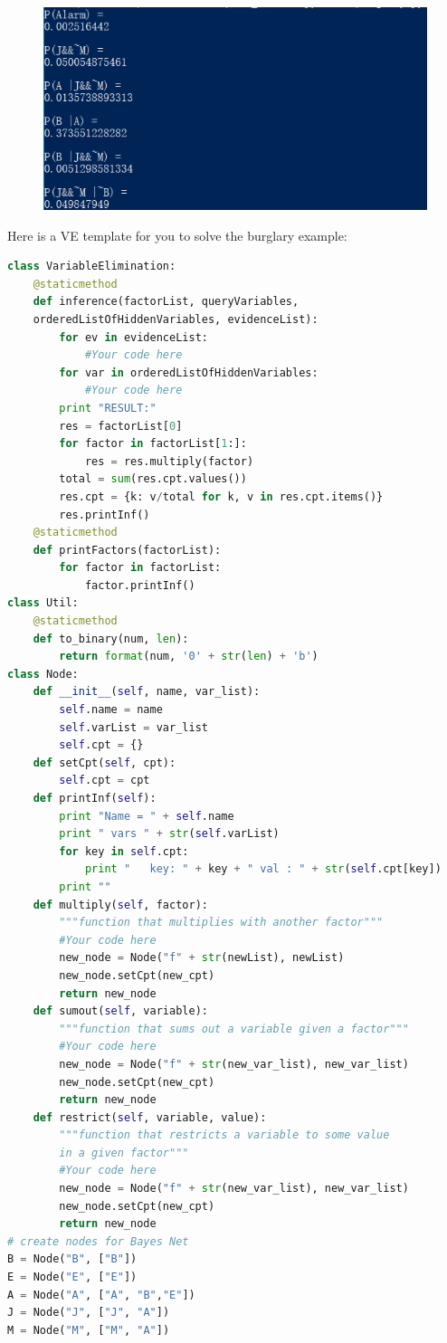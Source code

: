 \documentclass[a4paper, 11pt]{article}
\begin{document}
\begin{figure}[ht]
\centering
\includegraphics[width=12cm]{Pic/burglar_result}
\end{figure}
Here is a VE template for you to solve the burglary example:
\begin{lstlisting}[language=Python,frame=single]
class VariableElimination:
    @staticmethod
    def inference(factorList, queryVariables, 
    orderedListOfHiddenVariables, evidenceList):
        for ev in evidenceList:
            #Your code here
        for var in orderedListOfHiddenVariables:
            #Your code here
        print "RESULT:"
        res = factorList[0]
        for factor in factorList[1:]:
            res = res.multiply(factor)
        total = sum(res.cpt.values())
        res.cpt = {k: v/total for k, v in res.cpt.items()}
        res.printInf()
    @staticmethod
    def printFactors(factorList):
        for factor in factorList:
            factor.printInf()
class Util:
    @staticmethod
    def to_binary(num, len):
        return format(num, '0' + str(len) + 'b')
class Node:
    def __init__(self, name, var_list):
        self.name = name
        self.varList = var_list
        self.cpt = {}
    def setCpt(self, cpt):
        self.cpt = cpt
    def printInf(self):
        print "Name = " + self.name
        print " vars " + str(self.varList)
        for key in self.cpt:
            print "   key: " + key + " val : " + str(self.cpt[key])
        print ""
    def multiply(self, factor):
        """function that multiplies with another factor"""
        #Your code here
        new_node = Node("f" + str(newList), newList)
        new_node.setCpt(new_cpt)
        return new_node
    def sumout(self, variable):
        """function that sums out a variable given a factor"""
        #Your code here
        new_node = Node("f" + str(new_var_list), new_var_list)
        new_node.setCpt(new_cpt)
        return new_node
    def restrict(self, variable, value):
        """function that restricts a variable to some value 
        in a given factor"""
        #Your code here
        new_node = Node("f" + str(new_var_list), new_var_list)
        new_node.setCpt(new_cpt)
        return new_node
# create nodes for Bayes Net
B = Node("B", ["B"])
E = Node("E", ["E"])
A = Node("A", ["A", "B","E"])
J = Node("J", ["J", "A"])
M = Node("M", ["M", "A"])


\end{lstlisting}
\end{document}
